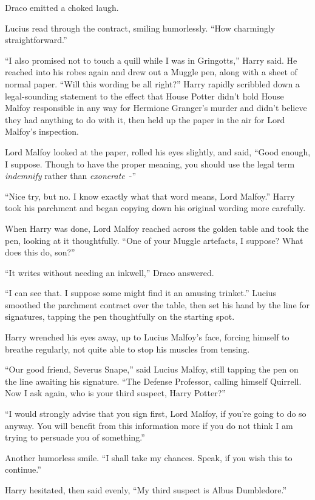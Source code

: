 Draco emitted a choked laugh.

Lucius read through the contract, smiling humorlessly. ``How charmingly straightforward.''

``I also promised not to touch a quill while I was in Gringotts,'' Harry said. He reached into his robes again and drew out a Muggle pen, along with a sheet of normal paper. ``Will this wording be all right?'' Harry rapidly scribbled down a legal-sounding statement to the effect that House Potter didn't hold House Malfoy responsible in any way for Hermione Granger's murder and didn't believe they had anything to do with it, then held up the paper in the air for Lord Malfoy's inspection.

Lord Malfoy looked at the paper, rolled his eyes slightly, and said, ``Good enough, I suppose. Though to have the proper meaning, you should use the legal term \emph{indemnify} rather than \emph{exonerate}~-''

``Nice try, but no. I know exactly what that word means, Lord Malfoy.'' Harry took his parchment and began copying down his original wording more carefully.

When Harry was done, Lord Malfoy reached across the golden table and took the pen, looking at it thoughtfully. ``One of your Muggle artefacts, I suppose? What does this do, son?''

``It writes without needing an inkwell,'' Draco answered.

``I can see that. I suppose some might find it an amusing trinket.'' Lucius smoothed the parchment contract over the table, then set his hand by the line for signatures, tapping the pen thoughtfully on the starting spot.

Harry wrenched his eyes away, up to Lucius Malfoy's face, forcing himself to breathe regularly, not quite able to stop his muscles from tensing.

``Our good friend, Severus Snape,'' said Lucius Malfoy, still tapping the pen on the line awaiting his signature. ``The Defense Professor, calling himself Quirrell. Now I ask again, who is your third suspect, Harry Potter?''

``I would strongly advise that you sign first, Lord Malfoy, if you're going to do so anyway. You will benefit from this information more if you do not think I am trying to persuade you of something.''

Another humorless smile. ``I shall take my chances. Speak, if you wish this to continue.''

Harry hesitated, then said evenly, ``My third suspect is Albus Dumbledore.''

